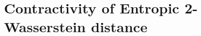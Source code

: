 \documentclass[11pt]{amsart}
\numberwithin{equation}{section}
\begin{document}


\section{Contractivity of Entropic 2-Wasserstein distance}\label{sec:monotonicity_W2}
\end{document}
